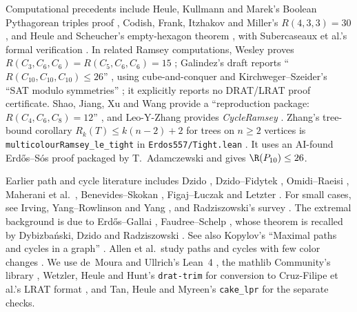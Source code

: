 Computational precedents include Heule, Kullmann and Marek's
Boolean Pythagorean triples proof \cite[Theorem~1]{HKM16}, Codish, Frank,
Itzhakov and Miller's $R(4,3,3)=30$ \cite[abstract]{CFIM16}, and Heule and
Scheucher's empty-hexagon theorem \cite{HS24}, with Subercaseaux et al.'s
formal verification \cite{SNG+24}. In related Ramsey computations, Wesley
proves $R(C_3,C_6,C_6)=R(C_5,C_6,C_6)=15$
\cite[Theorems~3 and~4]{Wes25}; Galindez's draft reports
``$R(C_{10},C_{10},C_{10})\le26$'' \cite[Theorem~1]{Gal26}, using
cube-and-conquer and Kirchweger--Szeider's ``SAT modulo symmetries''
\cite[title]{KS24}; it explicitly reports no DRAT/LRAT proof certificate.
Shao, Jiang, Xu and Wang provide a
``reproduction package: $R(C_4,C_6,C_8)=12$'' \cite[title]{SJXW26}, and
Leo-Y-Zhang provides \textit{CycleRamsey} \cite{Zha26}.
Zhang's tree-bound corollary $R_k(T)\le k(n-2)+2$ for trees on $n\ge2$
vertices is \texttt{multicolourRamsey\_le\_tight} in
\texttt{Erdos557/Tight.lean} \cite{ZhJ26}. It uses an AI-found
Erdős--Sós proof packaged by T.~Adamczewski and gives $\R(P_{10})\le26$.

Earlier path and cycle literature includes Dzido \cite{Dzi05},
Dzido--Fidytek \cite{DF09}, Omidi--Raeisi \cite{OR11},
Maherani et al.\ \cite[Theorem~1.1]{MORS15}, Benevides--Skokan
\cite{BS09}, Figaj--Łuczak \cite{FL07} and Letzter \cite{Let22}.
For small cases, see Irving, Yang--Rowlinson and Yang
\cite{Irv74,YR94,YR92,Yan95}, and Radziszowski's survey
\cite[p.~65, Section~6.4.1(c)]{Rad26}.
The extremal background is due to Erdős--Gallai \cite{EG59},
Faudree--Schelp \cite{FS75}, whose theorem is recalled by Dybizbański,
Dzido and Radziszowski \cite[Theorem~4]{DDR16}. See also Kopylov's ``Maximal paths and cycles in a graph'' \cite[title]{Kop77}.
Allen et al.\ study paths and cycles with few color changes
\cite[title]{ABC+26}.
We use de~Moura and Ullrich's Lean~4 \cite{MU21}, the mathlib Community's
library \cite{Mathlib20}, Wetzler, Heule and Hunt's \texttt{drat-trim}
\cite{WHH14} for conversion to Cruz-Filipe et al.'s LRAT format
\cite{CHH+17}, and Tan, Heule and Myreen's \texttt{cake\_lpr}
\cite{THM21} for the separate checks.


